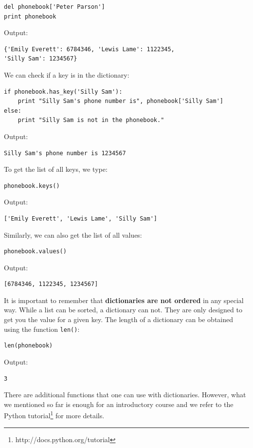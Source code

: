 \begin{verbatim}
del phonebook['Peter Parson']
print phonebook
\end{verbatim}
Output:

\begin{verbatim}
{'Emily Everett': 6784346, 'Lewis Lame': 1122345, 
'Silly Sam': 1234567}
\end{verbatim}
We can check if a key is in the dictionary:

\begin{verbatim}
if phonebook.has_key('Silly Sam'):
    print "Silly Sam's phone number is", phonebook['Silly Sam']
else:
    print "Silly Sam is not in the phonebook."
\end{verbatim}
Output:

\begin{verbatim}
Silly Sam's phone number is 1234567
\end{verbatim}
To get the list of all keys, we type:

\begin{verbatim}
phonebook.keys()
\end{verbatim}
Output:

\begin{verbatim}
['Emily Everett', 'Lewis Lame', 'Silly Sam']
\end{verbatim}
Similarly, we can also get the list of all values:

\begin{verbatim}
phonebook.values()
\end{verbatim}
Output:

\begin{verbatim}
[6784346, 1122345, 1234567]
\end{verbatim}
It is important to remember that {\bf dictionaries are not ordered} in any 
special way. While a list can be sorted, a dictionary can not. They are only 
designed to get you the value for a given key. 
The length of a dictionary can be obtained using the function {\tt len()}:

\begin{verbatim}
len(phonebook)
\end{verbatim}
Output:

\begin{verbatim}
3
\end{verbatim}
There are additional functions that one can use with dictionaries. However, 
what we mentioned so far is enough for an introductory course and we refer 
to the Python tutorial\footnote{http://docs.python.org/tutorial} for more 
details.

